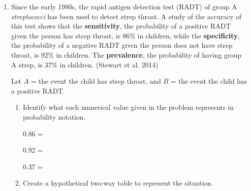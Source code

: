 \documentclass[
]{report}
\begin{document}
\vspace{0.55in}

\newpage

\newpage

\begin{enumerate}
\def\labelenumi{\arabic{enumi}.}
\setcounter{enumi}{1}
\item
  Since the early 1980s, the rapid antigen detection test (RADT) of group A \emph{streptococci} has been used to detect strep throat. A study of the accuracy of this test shows that the \textbf{sensitivity}, the probability of a positive RADT given the person has strep throat, is 86\% in children, while the \textbf{specificity}, the probability of a negative RADT given the person does not have strep throat, is 92\% in children. The \textbf{prevalence}, the probability of having group A strep, is 37\% in children. (Stewart et al. 2014)
  \vspace{1mm}

  Let \(A\) = the event the child has strep throat, and \(B\) = the event the child has a positive RADT.
  \vspace{0.1in}

  \begin{enumerate}
  \def\labelenumii{\alph{enumii}.}
  \item
    Identify what each numerical value given in the problem represents in probability notation.
    \vspace{.1in}

    0.86 =\\
    \vspace{.1in}

    0.92 =\\
    \vspace{.1in}

    0.37 =\\
    \vspace{.1in}
  \item
    Create a hypothetical two-way table to represent the situation.
  \end{enumerate}
\end{enumerate}
\end{document}
